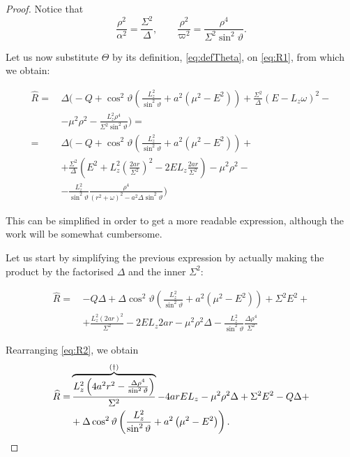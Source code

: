 \begin{proof}
	Notice that
	\[
	\frac{\rho^2}{\alpha^2} = \frac{\Sigma^2}{\Delta}, \qquad \frac{\rho^2}{\varpi^2} = \frac{\rho^4}{\Sigma^2 \sin^2\vartheta}.
	\]
	
	Let us now substitute $\Theta$ by its definition, \autoref{eq:defTheta}, on \autoref{eq:R1}, from which we obtain:
	
	\begin{align}
	\widehat{R} =\,& \Delta \biggl( -Q + \cos^2\vartheta\left( \frac{L_z^2}{\sin^2\vartheta} + a^2 (\mu^2 - E^2) \right) + \frac{\Sigma^2}{\Delta}(E - L_z\omega)^2 - \nonumber \\
	&- \mu^2\rho^2 - \frac{L_z^2\rho^4}{\Sigma^2\sin^2\vartheta} \biggr) = \nonumber \\
	=\,& \Delta \biggl( -Q + \cos^2\vartheta\left( \frac{L_z^2}{\sin^2\vartheta} + a^2 (\mu^2 - E^2) \right) + \nonumber \\
	&+ \frac{\Sigma^2}{\Delta}\left( E^2 + L_z^2\left( \frac{2ar}{\Sigma^2} \right)^2 - 2EL_z\frac{2ar}{\Sigma^2} \right)  - \mu^2\rho^2 - \nonumber \\
	&- \frac{L_z^2}{\sin^2\vartheta}\frac{\rho^4}{(r^2 + \omega)^2 - a^2\Delta\sin^2\vartheta} \biggr)
	\end{align}
	
	This can be simplified in order to get a more readable expression, although the work will be somewhat cumbersome.
	
	Let us start by simplifying the previous expression by actually making the product by the factorised $\Delta$ and the inner $\Sigma^2$:
	
	\begin{align}
	\widehat{R} =\,& -Q\Delta + \Delta\cos^2\vartheta\left( \frac{L_z^2}{\sin^2\vartheta} + a^2 (\mu^2 - E^2) \right) + \Sigma^2 E^2 + \nonumber \\
	&+ \frac{L_z^2 (2ar)^2}{\Sigma^2} - 2 E L_z 2ar  - \mu^2\rho^2\Delta - \frac{L_z^2}{\sin^2\vartheta}\frac{\Delta\rho^4}{\Sigma^2}
	\label{eq:R2}
	\end{align}
	
	Rearranging \autoref{eq:R2}, we obtain
	\begin{align}
	\widehat{R} =& \overbrace{\frac{L_z^2 \left(4a^2r^2 - \frac{\Delta\rho^4}{\sin^2\vartheta}\right)}{\Sigma^2}}^{\text{(\dag)}} - 4 a r E L_z - \mu^2 \rho^2 \Delta + \Sigma^2 E^2 - Q \Delta + \nonumber \\ 
	&+ \Delta\cos^2\vartheta\left(\frac{L_z^2}{\sin^2\vartheta} + a^2\left(\mu^2 - E^2\right)\right).
	\end{align}
	

\end{proof}
